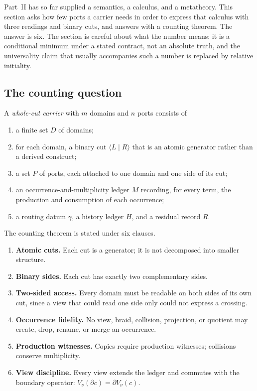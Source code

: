\label{sec:six-port-body}

Part~II has so far supplied a semantics, a calculus, and a metatheory.  This section asks
how few ports a carrier needs in order to express that calculus with three readings and
binary cuts, and answers with a counting theorem.  The answer is six.  The section is
careful about what the number means: it is a conditional minimum under a stated contract,
not an absolute truth, and the universality claim that usually accompanies such a number is
replaced by relative initiality.

\subsection{The counting question}

\begin{definition}\label{def:whole-cut-carrier}
A \emph{whole-cut carrier} with $m$ domains and $n$ ports consists of
\begin{enumerate}
\item a finite set $D$ of domains;
\item for each domain, a binary cut $\langle L\mid R\rangle$ that is an atomic generator
  rather than a derived construct;
\item a set $P$ of ports, each attached to one domain and one side of its cut;
\item an occurrence-and-multiplicity ledger $M$ recording, for every term, the
  production and consumption of each occurrence;
\item a routing datum $\gamma$, a history ledger $H$, and a residual record $R$.
\end{enumerate}
\end{definition}

\begin{definition}\label{def:six-port-contract}
The counting theorem is stated under six clauses.
\begin{enumerate}
\item \textbf{Atomic cuts.}  Each cut is a generator; it is not decomposed into smaller
  structure.
\item \textbf{Binary sides.}  Each cut has exactly two complementary sides.
\item \textbf{Two-sided access.}  Every domain must be readable on both sides of its own
  cut, since a view that could read one side only could not express a crossing.
\item \textbf{Occurrence fidelity.}  No view, braid, collision, projection, or quotient may
  create, drop, rename, or merge an occurrence.
\item \textbf{Production witnesses.}  Copies require production witnesses; collisions
  conserve multiplicity.
\item \textbf{View discipline.}  Every view extends the ledger and commutes with the
  boundary operator: $V_\nu(\partial c)=\partial V_\nu(c)$.
\end{enumerate}
\end{definition}


